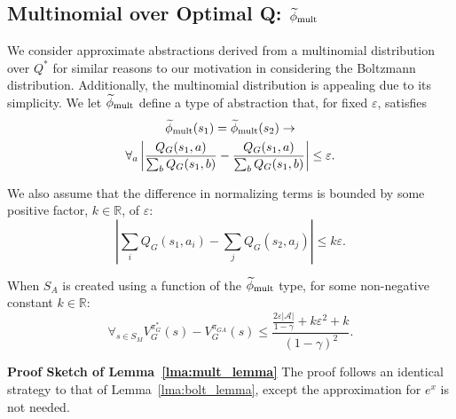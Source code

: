 \subsection{Multinomial over Optimal Q: $\epMu$}
\label{sec:mult}

We consider approximate abstractions derived from a multinomial distribution over $Q^*$ for similar reasons to our motivation in considering the Boltzmann distribution. Additionally, the multinomial distribution is appealing due to its simplicity.
\bdefn{$\epMu$}
We let $\epMu$ define a type of abstraction that, for fixed $\varepsilon$, satisfies
\begin{multline}
\widetilde \phi_{\text{mult}}(s_1) = \widetilde \phi_{\text{mult}}(s_2) \rightarrow \\
\forall_{a} \left|\frac{Q_G(s_1,a)}{\sum_b Q_G(s_1,b)} - \frac{Q_G(s_1,a)}{\sum_b Q_G(s_1,b)}\right| \leq \varepsilon.
\end{multline}
\edefn

We also assume that the difference in normalizing terms is bounded by some positive factor, $k \in \mathbb{R}$, of $\varepsilon$:
\begin{equation}
\left |\sum_i Q_G(s_1,a_i) - \sum_j Q_G(s_2,a_j) \right | \leq k\varepsilon.
\end{equation}
\begin{lma} When $S_A$ is created using a function of the $\epMu$ type, for some non-negative constant $k \in \mathbb{R}$:
\begin{equation}
\forall_{s \in S_M} V_G^{\pi^*_G}(s) - V_G^{\pi_{GA}}(s) \leq \frac{\frac{2\varepsilon|\mathcal{A}|}{1-\gamma} + k \varepsilon^2 + k}{(1-\gamma)^2}.
\end{equation}
\label{lma:mult_lemma}
\end{lma}

{\bf Proof Sketch of Lemma~\ref{lma:mult_lemma}} The proof follows an identical strategy to that of Lemma~\ref{lma:bolt_lemma}, except the approximation for $e^x$ is not needed.


